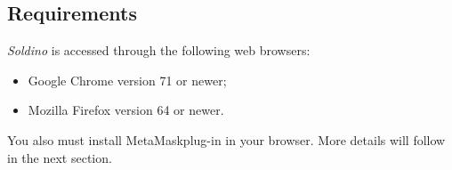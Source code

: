 	\subsection{Requirements}
	\textit{Soldino} is accessed through the following web browsers:
	\begin{itemize}
		\item Google Chrome version 71 or newer;
		\item Mozilla Firefox version 64 or newer.
	\end{itemize}
	You also must install MetaMask\glosp plug-in in your browser. More 
	details will follow in the next section. 